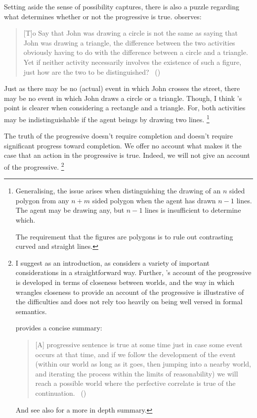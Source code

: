 \begin{note}
  Setting aside the sense of possibility \assuPP{} captures, there is also a puzzle regarding what determines whether or not the progressive is true.
  \citeauthor{Dowty:1979vq} observes:
  \begin{quote}
    [T]o Say that John was drawing a circle is not the same as saying that John was drawing a triangle, the difference between the two activities obviously having to do with the difference between a circle and a triangle.
    Yet if neither activity necessarily involves the existence of such a figure, just how are the two to be distinguished?%
    \mbox{ }\hfill\mbox{(\citeyear[133]{Dowty:1979vq})}
  \end{quote}

  Just as there may be no (actual) event in which John crosses the street, there may be no event in which John draws a circle or a triangle.
  Though, I think \citeauthor{Dowty:1979vq}'s point is clearer when considering a rectangle and a triangle.
  For, both activities may be indistinguishable if the agent beings by drawing two lines.%
  \footnote{
    Generalising, the issue arises when distinguishing the drawing of an \(n\) sided polygon from any \(n + m\) sided polygon when the agent has drawn \(n - 1\) lines.
    The agent may be drawing any, but \(n - 1\) lines is insufficient to determine which.

    The requirement that the figures are polygons is to rule out contrasting curved and straight lines.
  }

  The truth of the progressive doesn't require completion and doesn't require significant progress toward completion.
  We offer no account what makes it the case that an action in the progressive is true.
  Indeed, we will not give an account of the progressive.%
  \footnote{
    \nocite{Portner:1998um}
    \nocite{Engelberg:1999vi}
    I suggest \textcite{Landman:1992wh} as an introduction, as \citeauthor{Landman:1992wh} considers a variety of important considerations in a straightforward way.
    Further, \citeauthor{Landman:1992wh}'s account of the progressive is developed in terms of closeness between worlds, and the way in which \citeauthor{Landman:1992wh} wrangles closeness to provide an account of the progressive is illustrative of the difficulties and does not rely too heavily on being well versed in formal semantics.

    \textcite{Szabo:2004ul} provides a concise summary:
    \begin{quote}
      [A] progressive sentence is true at some time just in case some event occurs at that time, and if we follow the development of the event (within our world as long as it goes, then jumping into a nearby world, and iterating the process within the limits of reasonability) we will reach a possible world where the perfective correlate is true of the continuation.%
      \mbox{ }\hfill\mbox{(\citeyear[34]{Szabo:2004ul})}
    \end{quote}
    And see also \citeauthor[764--766]{Portner:1998um} for a more in depth summary.

}
\end{note}

